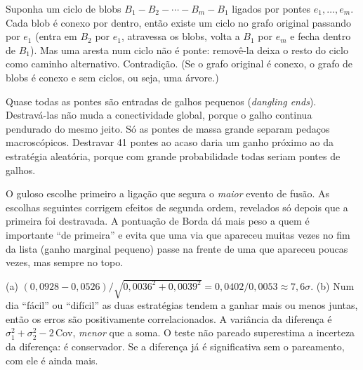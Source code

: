 \documentclass[11pt]{article}
\begin{document}
Suponha um ciclo de blobs $B_1-B_2-\cdots-B_m-B_1$ ligados por pontes $e_1,\dots,e_m$. Cada blob é conexo por dentro, então existe um ciclo no grafo original passando por $e_1$ (entra em $B_2$ por $e_1$, atravessa os blobs, volta a $B_1$ por $e_m$ e fecha dentro de $B_1$). Mas uma aresta num ciclo não é ponte: removê-la deixa o resto do ciclo como caminho alternativo. Contradição. (Se o grafo original é conexo, o grafo de blobs é conexo e sem ciclos, ou seja, uma árvore.)

Quase todas as pontes são entradas de galhos pequenos (\emph{dangling ends}). Destravá-las não muda a conectividade global, porque o galho continua pendurado do mesmo jeito. Só as pontes de massa grande separam pedaços macroscópicos. Destravar 41 pontes ao acaso daria um ganho próximo ao da estratégia aleatória, porque com grande probabilidade todas seriam pontes de galhos.

O guloso escolhe primeiro a ligação que segura o \emph{maior} evento de fusão. As escolhas seguintes corrigem efeitos de segunda ordem, revelados só depois que a primeira foi destravada. A pontuação de Borda dá mais peso a quem é importante ``de primeira'' e evita que uma via que apareceu muitas vezes no fim da lista (ganho marginal pequeno) passe na frente de uma que apareceu poucas vezes, mas sempre no topo.

(a) $(0{,}0928-0{,}0526)/\sqrt{0{,}0036^2+0{,}0039^2} = 0{,}0402/0{,}0053\approx7{,}6\sigma$. (b) Num dia ``fácil'' ou ``difícil'' as duas estratégias tendem a ganhar mais ou menos juntas, então os erros são positivamente correlacionados. A variância da diferença é $\sigma_1^2+\sigma_2^2-2\,\mathrm{Cov}$, \emph{menor} que a soma. O teste não pareado superestima a incerteza da diferença: é conservador. Se a diferença já é significativa sem o pareamento, com ele é ainda mais.
\end{document}

